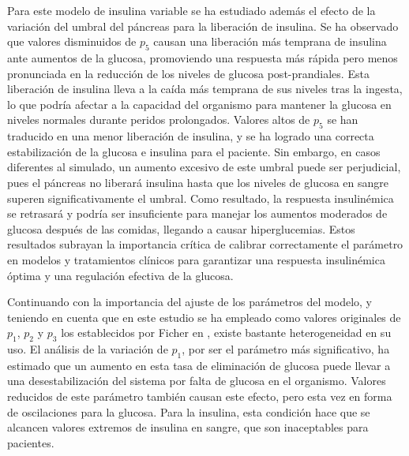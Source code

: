 Para este modelo de insulina variable se ha estudiado además el efecto de la variación del umbral del páncreas para la liberación de insulina. 
Se ha observado que valores disminuidos de $p_5$ causan una liberación más temprana de insulina ante aumentos de la glucosa, promoviendo una respuesta más rápida pero menos pronunciada en la reducción de los niveles de glucosa post-prandiales. Esta liberación de insulina lleva a la caída más temprana de sus niveles tras la ingesta, lo que podría afectar a la capacidad del organismo para mantener la glucosa en niveles normales durante peridos prolongados. Valores altos de $p_5$ se han traducido en una menor liberación de insulina, y se ha logrado una correcta estabilización de la glucosa e insulina para el paciente. Sin embargo, en casos diferentes al simulado, un aumento excesivo de este umbral puede ser perjudicial, pues el páncreas no liberará insulina hasta que los niveles de glucosa en sangre superen significativamente el umbral. Como resultado, la respuesta insulinémica se retrasará y podría ser insuficiente para manejar los aumentos moderados de glucosa después de las comidas, llegando a causar hiperglucemias.
Estos resultados subrayan la importancia crítica de calibrar correctamente el parámetro en modelos y tratamientos clínicos para garantizar una respuesta insulinémica óptima y una regulación efectiva de la glucosa.

Continuando con la importancia del ajuste de los parámetros del modelo, y teniendo en cuenta que en este estudio se ha empleado como valores originales de $p_1$, $p_2$ y $p_3$ los establecidos por Ficher en \cite{fisher1991semiclosed}, existe bastante heterogeneidad en su uso. El análisis de la variación de $p_1$, por ser el parámetro más significativo, ha estimado que un aumento en esta tasa de eliminación de glucosa puede llevar a una desestabilización del sistema por falta de glucosa en el organismo. Valores reducidos de este parámetro también causan este efecto, pero esta vez en forma de oscilaciones para la glucosa. Para la insulina, esta condición hace que se alcancen valores extremos de insulina en sangre, que son inaceptables para pacientes.

